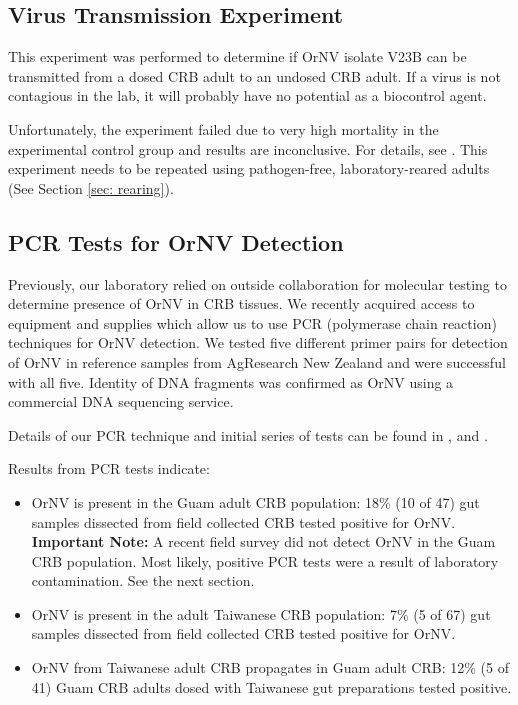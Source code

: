 \documentclass[12pt,
letterpaper,english,bibliography=totocnumbered, abstract=on]{scrartcl}
\begin{document}
\subsection{Virus Transmission Experiment}
\label{sec: virus transmission expt}

This experiment was performed to determine if OrNV isolate V23B can be transmitted from a dosed CRB adult to an undosed CRB adult. If a virus is not contagious in the lab, it will probably have no potential as a biocontrol agent. 

Unfortunately, the experiment failed due to very high mortality in the experimental control group and results are inconclusive. For details, see \cite{grasela_guam_2020}. This experiment needs to be repeated using pathogen-free, laboratory-reared adults (See Section \ref{sec: rearing}).

\subsection{PCR Tests for OrNV Detection}
\label{sec: pcr}

Previously, our laboratory relied on outside collaboration for molecular testing to determine presence of OrNV in CRB tissues. We recently acquired access to equipment and supplies which allow us to use PCR (polymerase chain reaction) techniques for OrNV detection. We tested five different primer pairs for detection of OrNV in reference samples from AgResearch New Zealand and were successful with all five. Identity of DNA fragments was confirmed as OrNV using a commercial DNA sequencing service.

Details of our PCR technique and initial series of tests can be found in \cite{grasela_technical_2020}, 
\cite{grasela_technical_2020-1} and \cite{grasela_technical_2020-2}.

Results from PCR tests indicate:
\label{(subsec: pcr results)}

\begin{itemize}

\item OrNV is present in the Guam adult CRB population: 18\% (10 of 47) gut samples dissected from field collected CRB tested positive for OrNV. \textbf{Important Note:} A recent field survey did not detect OrNV in the Guam CRB population. Most likely, positive PCR tests were a result of laboratory contamination. See the next section.

\item  OrNV is present in the adult Taiwanese CRB population:  7\% (5 of 67) gut samples dissected from field collected CRB tested positive for OrNV. 

\item  OrNV from Taiwanese adult CRB propagates in Guam adult CRB: 12\% (5 of 41) Guam CRB adults dosed with Taiwanese gut preparations tested positive.   

\end{itemize}
\end{document}
